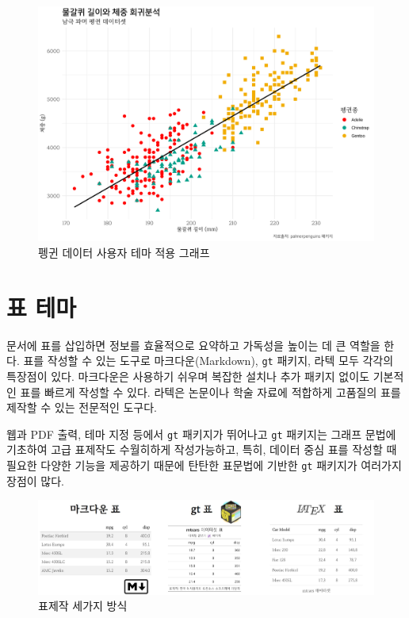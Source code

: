 \documentclass[
  letterpaper,
]{book}
\begin{document}
\begin{figure}

{\centering \includegraphics{images/penguins_theme_gg.jpg}

}

\caption{펭귄 데이터 사용자 테마 적용 그래프}

\end{figure}

\hypertarget{uxd45c-uxd14cuxb9c8}{%
\chapter{표 테마}\label{uxd45c-uxd14cuxb9c8}}

문서에 표를 삽입하면 정보를 효율적으로 요약하고 가독성을 높이는 데 큰
역할을 한다. 표를 작성할 수 있는 도구로 마크다운(Markdown), \texttt{gt}
패키지, 라텍 모두 각각의 특장점이 있다. 마크다운은 사용하기 쉬우며
복잡한 설치나 추가 패키지 없이도 기본적인 표를 빠르게 작성할 수 있다.
라텍은 논문이나 학술 자료에 적합하게 고품질의 표를 제작할 수 있는
전문적인 도구다.

웹과 PDF 출력, 테마 지정 등에서 \texttt{gt} 패키지가 뛰어나고
\texttt{gt} 패키지는 그래프 문법에 기초하여 고급 표제작도 수월히하게
작성가능하고, 특히, 데이터 중심 표를 작성할 때 필요한 다양한 기능을
제공하기 때문에 탄탄한 표문법에 기반한 \texttt{gt} 패키지가 여러가지
장점이 많다.

\begin{figure}

{\centering \includegraphics{images/table_three.jpg}

}

\caption{표제작 세가지 방식}

\end{figure}
\end{document}
